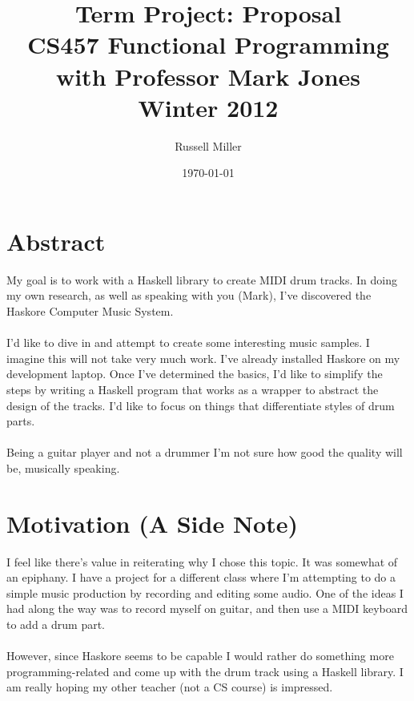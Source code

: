 \documentclass{article}
\title{Term Project: Proposal\\
CS457 Functional Programming\\
with Professor Mark Jones\\
Winter 2012}
\author{Russell Miller}
\date{\today}
\begin{document}
\maketitle

\section*{Abstract}
My goal is to work with a Haskell library to create MIDI drum tracks. In doing 
my own research, as well as speaking with you (Mark), I've discovered the 
Haskore Computer Music System.\\
\\
I'd like to dive in and attempt to create some interesting music samples. I 
imagine this will not take very much work. I've already installed Haskore on my
development laptop. Once I've determined the basics, I'd 
like to simplify the steps by writing a Haskell program that works as a wrapper
to abstract the design of the tracks. I'd like to focus on things that 
differentiate styles of drum parts.\\
\\
Being a guitar player and not a drummer I'm not sure how good the quality will 
be, musically speaking.

\section*{Motivation (A Side Note)}
I feel like there's value in reiterating why I chose this topic. It was somewhat
of an epiphany. I have a project for a different class where I'm attempting to
do a simple music production by recording and editing some audio. One of the 
ideas I had along the way was to record myself on guitar, and then use a MIDI
keyboard to add a drum part.\\
\\
However, since Haskore seems to be capable I would rather do something more
programming-related and come up with the drum track using a Haskell library. I
am really hoping my other teacher (not a CS course) is impressed.
\end{document}
